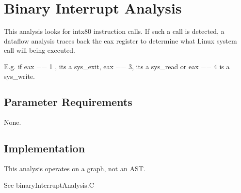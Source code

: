 %
%

\section{Binary Interrupt Analysis}
\label{BinaryInterruptAnalysis::overview}

This analysis looks for intx80 instruction calls. If such a call is detected,
a dataflow analysis traces back the eax register to determine what Linux system call will being executed.

E.g. if eax == 1 , its a sys\_exit, eax == 3, its a sys\_read or eax == 4 is a sys\_write.


\subsection{Parameter Requirements}

None.

\subsection{Implementation}

This analysis operates on a graph, not an AST.

See binaryInterruptAnalysis.C


